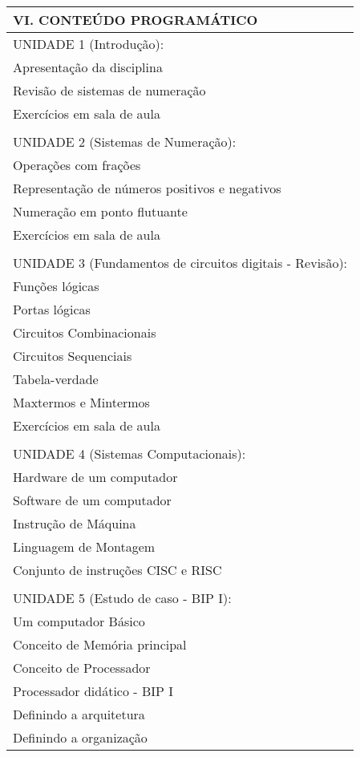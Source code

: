 \documentclass[12pt]{article}
\begin{document}
\begin{longtable}{|L{1.025\textwidth}|} \hline
%
{\bf VI. CONTEÚDO PROGRAMÁTICO } \\ \hline
UNIDADE 1 (Introdução):\\
      Apresentação da disciplina\\
      Revisão de sistemas de numeração\\
      Exercícios em sala de aula\\
\\
UNIDADE 2 (Sistemas de Numeração):\\
      Operações com frações\\
      Representação de números positivos e negativos\\
      Numeração em ponto flutuante\\
      Exercícios em sala de aula\\
\\
UNIDADE 3 (Fundamentos de circuitos digitais - Revisão):\\
      Funções lógicas\\
      Portas lógicas\\
      Circuitos Combinacionais\\ 
      Circuitos Sequenciais\\
      Tabela-verdade\\
      Maxtermos e Mintermos\\
      Exercícios em sala de aula\\
      \\
UNIDADE 4 (Sistemas Computacionais):\\
      Hardware de um computador\\
      Software de um computador\\
      Instrução de Máquina\\
      Linguagem de Montagem\\
      Conjunto de instruções CISC e RISC\\
\\
UNIDADE 5 (Estudo de caso - BIP I):\\
      Um computador Básico \\
      Conceito de Memória principal\\
      Conceito de Processador \\
      Processador didático - BIP I\\
      Definindo a arquitetura\\
      Definindo a organização \\

\end{longtable}
\end{document}
